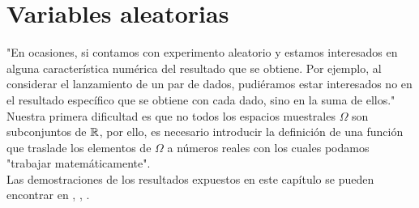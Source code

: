 \section{Variables aleatorias}
"En ocasiones, si contamos con experimento aleatorio y estamos interesados en alguna característica numérica del resultado que se obtiene. Por ejemplo, al considerar el lanzamiento de un par de dados, pudiéramos estar interesados no en el resultado específico que se obtiene con cada dado, sino en la suma de ellos."\\
Nuestra primera dificultad es que no todos los espacios muestrales $\Omega$ son subconjuntos de ${\mathbb{R}}$, por ello, es necesario introducir la definición de una función que traslade los elementos de $\Omega$ a números reales con los cuales podamos "trabajar matemáticamente".\\
Las demostraciones de los resultados expuestos en este capítulo se pueden encontrar en \cite{intro-probabilidad}, \cite{Feller},\cite{Rincon1} \cite{Rincon2}.
\begin{comment}
\begin{Def}
El $\sigma-$álgebra de Borel en $\R$ denotado por $\mathscr{B}(\R)$ es
$$\mathscr{B}(\R)=\sigma(\{(a,\thinspace b)\subset\R:a\leq b\})$$
\end{Def}
\begin{Prop}
\textbf{ }\\
\begin{enumerate}
    \item Todo intervalo de $\R$ es un booreliano.
    \item Los subconjuntos cerrados y abiertos de $\R$ son borelianos
\end{enumerate}
\end{Prop}
\begin{Def}
Una función $\phi:\R^n\rightarrow\R^m$ es llamada boreliana si $\phi^{-1}(B)$ es un conjunto boreliano de $R^{-1}$ para todo boreliano B de $\R$.
\end{Def}
Recuérde que si $\phi:\R^n\rightarrow\R^m$ es cualquier función, se cumple que $\phi^{-1}(B^c)=[\phi^{-1}(B)]^c$
 $\phi^{-1}(\bigcup_{\lambda}B_{\lambda})=\bigcup_{\lambda}\phi^{-1}(B_\lambda)$. Esto
implica que $\{B\subset \R^m: \phi^{-1}(B)\in B(\R^n)\}$ es un $\sigma$-álgebra de subconjuntos de $R^m$ , de manera que, para demostrar que una
cierta función f es boreliana, basta con probar que $\phi^{-1}(B)$ es un conjunto boreliano de $\R^n$ para cualquier elemento B abierto (o cualquier elemento B de una familia de generadores de los borelianos de $\R^m$).
Con base de esta idea, se pueden demostrar las siguientes proposiciones.
\begin{Prop}
$\phi:\R^n\rightarrow\R^m$,  $g:\R^m\rightarrow\R^p$ son borelianos, entonces $g\circ\phi$ es boreliano
\end{Prop}
\begin{Prop} Si $\phi:\R^n\rightarrow\R^m$ es continua, entonces es boreliana.
\end{Prop}
\end{comment}
